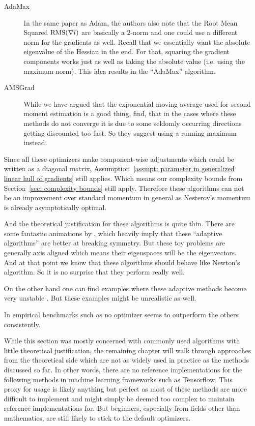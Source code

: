 \begin{description}
	\item[AdaMax] \parencite{kingmaAdamMethodStochastic2017} In the same paper
	as Adam, the authors also note that the Root Mean Squared
	\(\text{RMS}(\nabla l)\) are basically a \(2\)-norm and one could use a
	different norm for the gradients as well.  Recall that we essentially want
	the absolute eigenvalue of the Hessian in the end. For that, squaring
	the gradient components works just as well as taking the absolute value (i.e.
	using the maximum norm). This idea results in the ``AdaMax'' algorithm.

	\item[AMSGrad] \parencite{reddiConvergenceAdam2019} While we have argued that
	the exponential moving average used for second moment estimation is a good
	thing, \textcite{reddiConvergenceAdam2019} find, that in the cases where
	these methods do not converge it is due to some seldomly occurring directions
	getting discounted too fast. So they suggest using a running maximum instead.
\end{description}

Since all these optimizers make component-wise adjustments which could be written
as a diagonal matrix, Assumption~\ref{assmpt: parameter in generalized linear
hull of gradients} still applies. Which means our complexity bounds from
Section~\ref{sec: complexity bounds} still apply. Therefore these algorithms
can not be an improvement over standard momentum in general as Nesterov's
momentum is already asymptotically optimal.

And the theoretical justification for these algorithms is quite thin. There
are some fantastic animations by \textcite{radfordVisualizingOptimizationAlgos2014},
which heavily imply that these ``adaptive algorithms'' are better at breaking
symmetry. But these toy problems are generally axis aligned which means their
eigenspaces will be the eigenvectors. And at that point we know that these
algorithms should behave like Newton's algorithm. So it is no surprise that they
perform really well.

On the other hand one can find examples where these adaptive methods become very
unstable
\parencite[e.g.][]{wilsonMarginalValueAdaptive2018,reddiConvergenceAdam2019}.
But these examples might be unrealistic as well.

In empirical benchmarks such as \textcite{schmidtDescendingCrowdedValley2021} no
optimizer seems to outperform the others consistently.

While this section was mostly concerned with commonly used algorithms with little
theoretical justification, the remaining chapter will walk through approaches
from the theoretical side which are not as widely used in practice as the
methods discussed so far. In other words, there are no reference implementations
for the following methods in machine learning frameworks such as Tensorflow.
This proxy for usage is likely anything but perfect as most of these methods are
more difficult to implement and might simply be deemed too complex to maintain
reference implementations for. But beginners, especially from fields other than
mathematics, are still likely to stick to the default optimizers.

